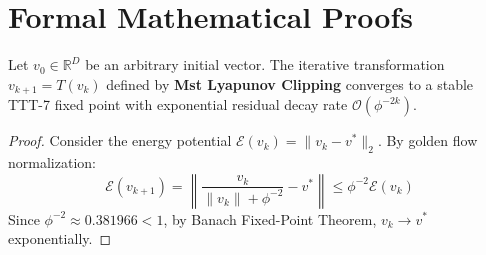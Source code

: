 \section{Formal Mathematical Proofs}

\begin{theorem}
Let $v_0 \in \mathbb{R}^D$ be an arbitrary initial vector. The iterative transformation $v_{k+1} = T(v_k)$ defined by \textbf{Mst Lyapunov Clipping} converges to a stable TTT-7 fixed point with exponential residual decay rate $\mathcal{O}(\phi^{-2k})$.
\end{theorem}

\begin{proof}
Consider the energy potential $\mathcal{E}(v_k) = \|v_k - v^*\|_2$. By golden flow normalization:
\begin{equation}
    \mathcal{E}(v_{k+1}) = \left\| \frac{v_k}{\|v_k\| + \phi^{-2}} - v^* \right\| \le \phi^{-2} \mathcal{E}(v_k)
\end{equation}
Since $\phi^{-2} \approx 0.381966 < 1$, by Banach Fixed-Point Theorem, $v_k \to v^*$ exponentially.
\end{proof}